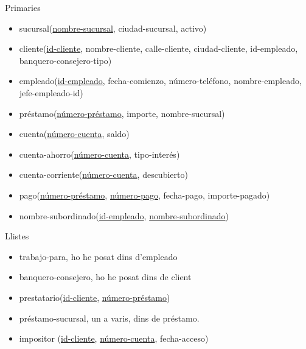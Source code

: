 %
Primaries
\begin{itemize}
    \item sucursal(\underline{nombre-sucursal}, ciudad-sucursal, activo)
    \item cliente(\underline{id-cliente}, nombre-cliente, calle-cliente,
        ciudad-cliente,
            id-empleado, banquero-consejero-tipo)
    \item empleado(\underline{id-empleado}, fecha-comienzo, número-teléfono,
        nombre-empleado, jefe-empleado-id)
    \item préstamo(\underline{número-préstamo}, importe,
            nombre-sucursal)
    \item cuenta(\underline{número-cuenta}, saldo)
    \item cuenta-ahorro(\underline{número-cuenta}, tipo-interés)
    \item cuenta-corriente(\underline{número-cuenta}, descubierto)
    \item pago(\underline{número-préstamo}, \underline{número-pago}, fecha-pago,
        importe-pagado)
    \item nombre-subordinado(\underline{id-empleado},
        \underline{nombre-subordinado})
    
\end{itemize}
%
Llistes
\begin{itemize}
    \item trabajo-para, ho he posat dins d'empleado
    \item banquero-consejero, ho he posat dins de client
    \item prestatario(\underline{id-cliente}, \underline{número-préstamo})
    \item préstamo-sucursal, un a varis, dins de préstamo.
    \item impositor (\underline{id-cliente}, \underline{número-cuenta},
        fecha-acceso)
\end{itemize}